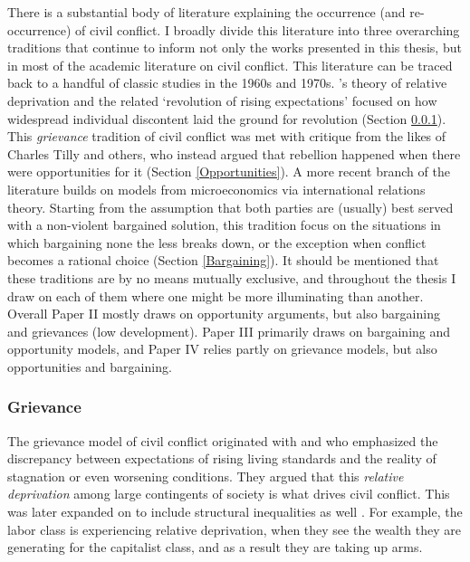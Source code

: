 There is a substantial body of literature explaining the occurrence (and
re-occurrence) of civil conflict. I broadly divide this literature into three
overarching traditions that continue to inform not only the works presented in
this thesis, but in most of the academic literature on civil conflict. This
literature can be traced back to a handful of classic studies in the 1960s and
1970s. \citet{GurrTedRobert1970Wmr}'s theory of relative deprivation and the
related `revolution of rising expectations' \citep{Davies_1962} focused on how
widespread individual discontent laid the ground for revolution (Section
\ref{Grievance}). This \textit{grievance} tradition of civil conflict was met
with critique from the likes of Charles Tilly and  others, who instead argued
that rebellion happened when there were opportunities for it (Section
\ref{Opportunities}). A more recent branch of the literature builds on models
from microeconomics via international relations theory. Starting from the
assumption that both parties are (usually) best served with a non-violent
bargained solution, this tradition focus on the situations in which bargaining
none the less breaks down, or the exception when conflict becomes a rational
choice (Section \ref{Bargaining}). It should be mentioned that these traditions
are by no means mutually exclusive, and throughout the thesis I draw on each of
them where one might be more illuminating than another. Overall Paper II mostly
draws on opportunity arguments, but also bargaining and grievances (low
development). Paper III  primarily draws on bargaining and opportunity models,
and Paper IV relies partly on grievance models, but also opportunities and
bargaining.

\subsubsection{Grievance} \label{Grievance}

The grievance model of civil conflict originated with
\citet{GurrTedRobert1970Wmr} and \citet{Davies_1962} who emphasized the
discrepancy between expectations of rising living standards and the reality of
stagnation or even worsening conditions. They argued that this \textit{relative
deprivation} among large contingents of society is what drives civil conflict.
This was later expanded on to include structural inequalities as well
\citep{Muller_1985, Muller_1987, ScottJamesC1977TMEo}. For example, the labor
class is experiencing relative deprivation, when they see the wealth they are
generating for the capitalist class, and as a result they are taking up arms.


